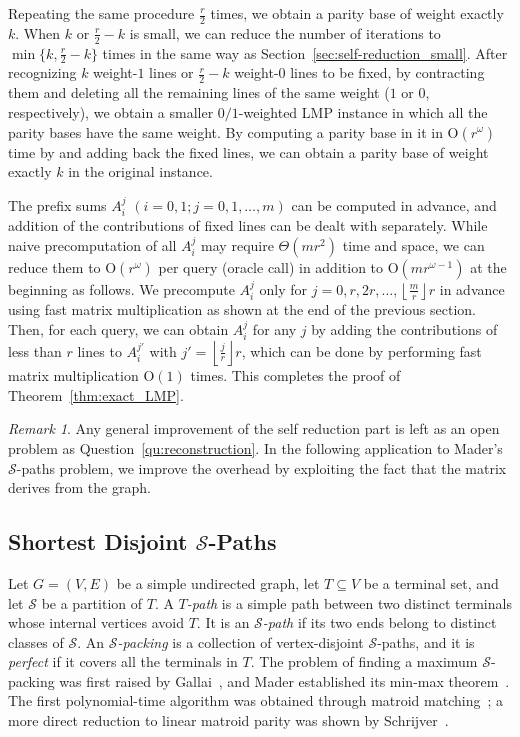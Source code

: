 \documentclass[11pt, a4paper]{article}
\theoremstyle{plain}
\theoremstyle{definition}
\theoremstyle{remark}
\newtheorem{remark}[theorem]{Remark}
\newcommand{\cS}{\mathcal{S}}
\begin{document}
Repeating the same procedure $\frac{r}{2}$ times, we obtain a parity base of weight exactly $k$.
When $k$ or $\frac{r}{2} - k$ is small, we can reduce the number of iterations to $\min\{k, \frac{r}{2} - k\}$ times in the same way as Section~\ref{sec:self-reduction_small}.
After recognizing $k$ weight-$1$ lines or $\frac{r}{2} - k$ weight-$0$ lines to be fixed, by contracting them and deleting all the remaining lines of the same weight ($1$ or $0$, respectively), we obtain a smaller $0/1$-weighted LMP instance in which all the parity bases have the same weight.
By computing a parity base in it in $\mathrm{O}(r^\omega)$ time by \cite{CLL2014} and adding back the fixed lines, we can obtain a parity base of weight exactly $k$ in the original instance.

The prefix sums $A_i^j$ $(i = 0, 1; j = 0, 1, \dots, m)$ can be computed in advance, and addition of the contributions of fixed lines can be dealt with separately.
While naive precomputation of all $A_i^j$ may require $\Theta(mr^2)$ time and space, we can reduce them to $\mathrm{O}(r^\omega)$ per query (oracle call) in addition to $\mathrm{O}(mr^{\omega - 1})$ at the beginning as follows.
We precompute $A_i^j$ only for $j = 0, r, 2r, \dots, \left\lfloor \frac{m}{r} \right\rfloor r$ in advance using fast matrix multiplication as shown at the end of the previous section.
Then, for each query, we can obtain $A_i^j$ for any $j$ by adding the contributions of less than $r$ lines to $A_i^{j'}$ with $j' = \left\lfloor \frac{j}{r} \right\rfloor r$, which can be done by performing fast matrix multiplication $\mathrm{O}(1)$ times.
This completes the proof of Theorem~\ref{thm:exact_LMP}.

\begin{remark}
Any general improvement of the self reduction part is left as an open problem as Question~\ref{qu:reconstruction}.
In the following application to Mader's $\cS$-paths problem, we improve the overhead by exploiting the fact that the matrix derives from the graph. 
\end{remark}



\subsection{Shortest Disjoint $\cS$-Paths}\label{sec:Mader}
Let $G=(V,E)$ be a simple undirected graph, let $T\subseteq V$ be a terminal set, and let $\cS$ be a partition of $T$.
A \emph{$T$-path} is a simple path between two distinct terminals whose internal vertices avoid $T$.
It is an \emph{$\cS$-path} if its two ends belong to distinct classes of $\cS$.
An \emph{$\cS$-packing} is a collection of vertex-disjoint $\cS$-paths, and it is \emph{perfect} if it covers all the terminals in $T$.
The problem of finding a maximum $\cS$-packing was first raised by Gallai~\cite{Gallai1961}, and Mader established its min-max theorem~\cite{Mader1978}.
The first polynomial-time algorithm was obtained through matroid matching~\cite{Lovasz1980,Lovasz1981}; a more direct reduction to linear matroid parity was shown by Schrijver~\cite{Schrijver2003}.
\end{document}

